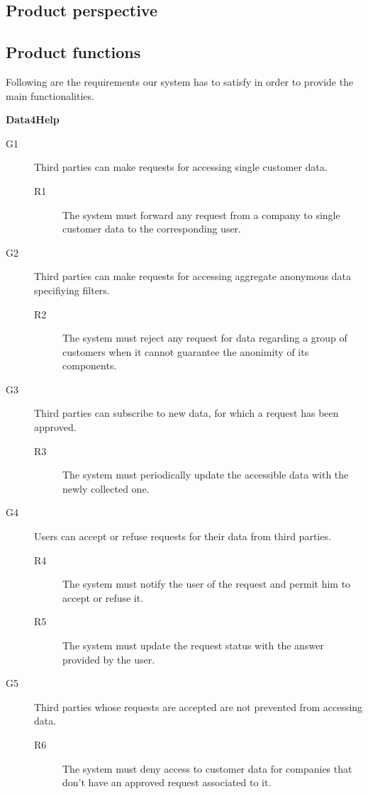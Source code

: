 \documentclass[../main.tex]{subfiles}
\begin{document}
\subsection{Product perspective}
\subsection{Product functions}

\vspace{8mm}

Following are the requirements our system has to satisfy in order to provide the main functionalities.

\vspace{8mm}

{\bf Data4Help}
\begin{description}
	\item [G1]  Third parties can make requests for accessing single customer data.
	\begin{description}
		\item [R1] The system must forward any request from a company to single customer data to the corresponding user.
	\end{description}

	\item [G2]  Third parties can make requests for accessing aggregate anonymous data specifiying filters.
	\begin{description}
		\item [R2] The system must reject any request for data regarding a group of customers when it cannot guarantee the anonimity of its components.
	\end{description}

	\item [G3]  Third parties can subscribe to new data, for which a request has been approved.
	\begin{description}
		\item [R3] The system must periodically update the accessible data with the newly collected one.
	\end{description}

	\item [G4]  Users can accept or refuse requests for their data from third parties.
	\begin{description}
		\item [R4] The system must notify the user of the request and permit him to accept or refuse it.
		\item [R5] The system must update the request status with the answer provided by the user.
	\end{description}

	\item [G5]  Third parties whose requests are accepted are not prevented from accessing data.
	\begin{description}
		\item [R6] The system must deny access to customer data for companies that don't have an approved request associated to it.
	\end{description}
\end{description}
\end{document}
